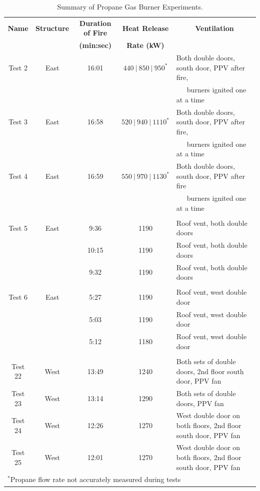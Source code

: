 \renewcommand{\baselinestretch}{1}
\begin{table}
\begin{center}
\caption{Summary of Propane Gas Burner Experiments.\label{table:exp_summary}}
\begin{tabular}{ccccl}
\toprule
\textbf{Name}  	& 	\textbf{Structure} 	& 	\textbf{Duration of Fire} 	& 	\textbf{Heat Release} 		& 	\multicolumn{1}{c}{\textbf{Ventilation}}	\\ 
				& 						& 		\textbf{(min:sec)} 		& 	\textbf{Rate (kW)}			& 													\\
\midrule
Test 2 			& 	East 				&  		16:01 					& 	$440~|~850~|~950^*$ 	 	& 	Both double doors, south door, PPV after fire,	\\
\multicolumn{4}{c}{} & ~~~burners ignited one at a time	    \\
Test 3			& 	East 				&  		16:58 					&   $520~|~940~|~1110^*$   		& 	Both double doors, south door, PPV after fire, \\
\multicolumn{4}{c}{} & ~~~burners ignited one at a time		\\
Test 4			& 	East 				&  		16:59 					&   $550~|~970~|~1130^*$ 		& 	Both double doors, south door, PPV after fire	\\
\multicolumn{4}{c}{} & ~~~burners ignited one at a time		\\
\multicolumn{5}{c}{} \\
Test 5 			& 	East 				&  		 9:36 					&  		1190 					& 	Roof vent, both double doors				 					\\
				& 						& 		10:15 					&  		1190 					& 	Roof vent, both double doors				 					\\
				& 						& 		 9:32 					&  		1190 					& 	Roof vent, both double doors				 					\\				
\multicolumn{5}{c}{} \\
Test 6			&	East 				&  		 5:27 					&  		1190 					& 	Roof vent, west double door					 	    			\\
				& 						& 		 5:03 					&  		1190 					& 	Roof vent, west double door					 	    			\\
				& 						& 		 5:12 					&  		1180 					& 	Roof vent, west double door					 	    			\\
\multicolumn{5}{c}{} \\
Test 22			&	West 				&  		13:49 					&  		1240 					& 	Both sets of double doors, 2nd floor south door, PPV fan 		\\
Test 23			&	West 				&  		13:14 					&  		1290 					& 	Both sets of double doors, PPV fan						 		\\
Test 24			&	West 				&  		12:26 					&  		1270 					&   West double door on both floors, 2nd floor south door, PPV fan 	\\
Test 25			&	West 				&  		12:01 					&  		1270 					& 	West double door on both floors, 2nd floor south door, PPV fan 	\\
\bottomrule
\multicolumn{5}{l}{$^*$\footnotesize{Propane flow rate not accurately measured during tests}}
\end{tabular}
\end{center}
\end{table}
\clearpage

